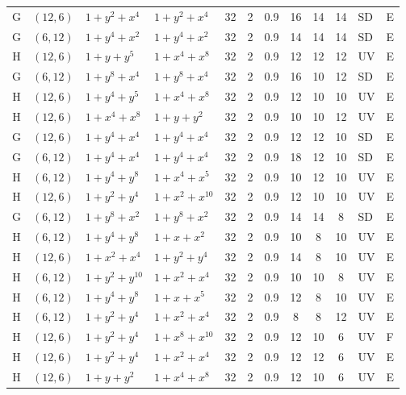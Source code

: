 \begin{table}[t]
\begin{tabular*}{\textwidth}{@{\extracolsep{\fill}}clllcccccclc}
G & $(12,6)$ & $1{+}y^{2}{+}x^{4}$ & $1{+}y^{2}{+}x^{4}$ & 32 & 2 & 0.9 & 16 & 14 & 14 & SD & E \\
G & $(6,12)$ & $1{+}y^{4}{+}x^{2}$ & $1{+}y^{4}{+}x^{2}$ & 32 & 2 & 0.9 & 14 & 14 & 14 & SD & E \\
H & $(12,6)$ & $1{+}y{+}y^{5}$ & $1{+}x^{4}{+}x^{8}$ & 32 & 2 & 0.9 & 12 & 12 & 12 & UV & E \\
G & $(6,12)$ & $1{+}y^{8}{+}x^{4}$ & $1{+}y^{8}{+}x^{4}$ & 32 & 2 & 0.9 & 16 & 10 & 12 & SD & E \\
H & $(12,6)$ & $1{+}y^{4}{+}y^{5}$ & $1{+}x^{4}{+}x^{8}$ & 32 & 2 & 0.9 & 12 & 10 & 10 & UV & E \\
H & $(12,6)$ & $1{+}x^{4}{+}x^{8}$ & $1{+}y{+}y^{2}$ & 32 & 2 & 0.9 & 10 & 10 & 12 & UV & E \\
G & $(12,6)$ & $1{+}y^{4}{+}x^{4}$ & $1{+}y^{4}{+}x^{4}$ & 32 & 2 & 0.9 & 12 & 12 & 10 & SD & E \\
G & $(6,12)$ & $1{+}y^{4}{+}x^{4}$ & $1{+}y^{4}{+}x^{4}$ & 32 & 2 & 0.9 & 18 & 12 & 10 & SD & E \\
H & $(6,12)$ & $1{+}y^{4}{+}y^{8}$ & $1{+}x^{4}{+}x^{5}$ & 32 & 2 & 0.9 & 10 & 12 & 10 & UV & E \\
H & $(12,6)$ & $1{+}y^{2}{+}y^{4}$ & $1{+}x^{2}{+}x^{10}$ & 32 & 2 & 0.9 & 12 & 10 & 10 & UV & E \\
G & $(6,12)$ & $1{+}y^{8}{+}x^{2}$ & $1{+}y^{8}{+}x^{2}$ & 32 & 2 & 0.9 & 14 & 14 & 8 & SD & E \\
H & $(6,12)$ & $1{+}y^{4}{+}y^{8}$ & $1{+}x{+}x^{2}$ & 32 & 2 & 0.9 & 10 & 8 & 10 & UV & E \\
H & $(12,6)$ & $1{+}x^{2}{+}x^{4}$ & $1{+}y^{2}{+}y^{4}$ & 32 & 2 & 0.9 & 14 & 8 & 10 & UV & E \\
H & $(6,12)$ & $1{+}y^{2}{+}y^{10}$ & $1{+}x^{2}{+}x^{4}$ & 32 & 2 & 0.9 & 10 & 10 & 8 & UV & E \\
H & $(6,12)$ & $1{+}y^{4}{+}y^{8}$ & $1{+}x{+}x^{5}$ & 32 & 2 & 0.9 & 12 & 8 & 10 & UV & E \\
H & $(6,12)$ & $1{+}y^{2}{+}y^{4}$ & $1{+}x^{2}{+}x^{4}$ & 32 & 2 & 0.9 & 8 & 8 & 12 & UV & E \\
H & $(12,6)$ & $1{+}y^{2}{+}y^{4}$ & $1{+}x^{8}{+}x^{10}$ & 32 & 2 & 0.9 & 12 & 10 & 6 & UV & F \\
H & $(12,6)$ & $1{+}y^{2}{+}y^{4}$ & $1{+}x^{2}{+}x^{4}$ & 32 & 2 & 0.9 & 12 & 12 & 6 & UV & E \\
H & $(12,6)$ & $1{+}y{+}y^{2}$ & $1{+}x^{4}{+}x^{8}$ & 32 & 2 & 0.9 & 12 & 10 & 6 & UV & E \\

\end{tabular*}
\end{table}
